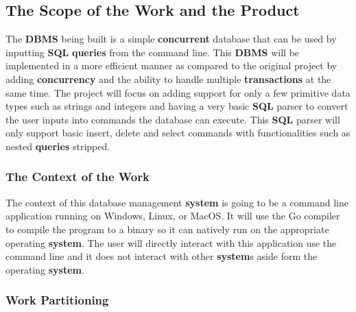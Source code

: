 \documentclass[12pt, titlepage]{article}
\begin{document}
\subsection{The Scope of the Work and the Product}

The \textbf{DBMS} being built is a simple \textbf{concurrent} database that can be used by inputting \textbf{SQL} \textbf{queries} from the command line. This \textbf{DBMS} will be implemented in a more efficient manner as compared to the original project by adding \textbf{concurrency} and the ability to handle multiple \textbf{transactions} at the same time. The project will focus on adding support for only a few primitive data types such as strings and integers and having a very basic \textbf{SQL} parser to convert the user inputs into commands the database can execute. This \textbf{SQL} parser will only support basic insert, delete and select commands with functionalities such as nested \textbf{queries} stripped.

\subsubsection{The Context of the Work}

The context of this database management \textbf{system} is going to be a command line application running on Windows, Linux, or MacOS. It will use the Go compiler to compile the program to a binary so it can natively run on the appropriate operating \textbf{system}. The user will directly interact with this application use the command line and it does not interact with other \textbf{system}s aside form the operating \textbf{system}.

\newpage

\subsubsection{Work Partitioning}
\end{document}
